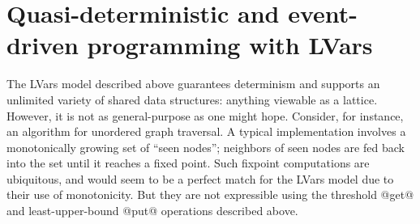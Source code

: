 \section{Quasi-deterministic and event-driven programming with LVars}\label{s:intro-quasi}

The LVars model described above guarantees determinism and supports an
unlimited variety of shared data structures: anything viewable as a
lattice.  However, it is not as general-purpose as one might hope.
Consider, for instance, an algorithm for unordered graph traversal.  A
typical implementation involves a monotonically growing set of ``seen
nodes''; neighbors of seen nodes are fed back into the set until it
reaches a fixed point.  Such fixpoint computations are ubiquitous, and
would seem to be a perfect match for the LVars model due to their use
of monotonicity.  But they are not expressible using the threshold
@get@ and least-upper-bound @put@ operations described above.

